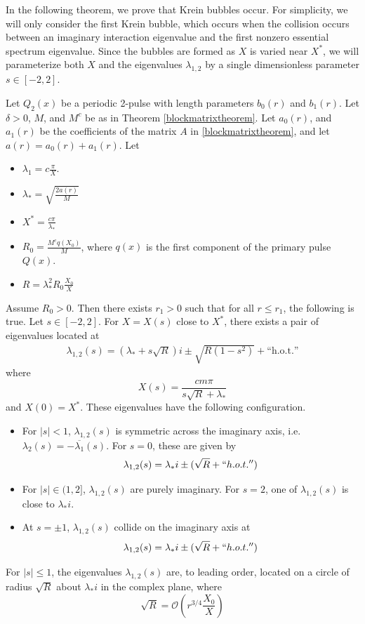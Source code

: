 \documentclass[thesis.tex]{subfiles}
\begin{document}
In the following theorem, we prove that Krein bubbles occur. For simplicity, we will only consider the first Krein bubble, which occurs when the collision occurs between an imaginary interaction eigenvalue and the first nonzero essential spectrum eigenvalue. Since the bubbles are formed as $X$ is varied near $X^*$, we will parameterize both $X$ and the eigenvalues $\lambda_{1,2}$ by a single dimensionless parameter $s \in [-2, 2]$. 

\begin{theorem}\label{theorem:kreinbubbles}
Let $Q_2(x)$ be a periodic 2-pulse with length parameters $b_0(r)$ and $b_1(r)$. Let $\delta > 0$, $M$, and $M^c$ be as in Theorem \ref{blockmatrixtheorem}. Let $a_0(r)$, and $a_1(r)$ be the coefficients of the matrix $A$ in \ref{blockmatrixtheorem}, and let $a(r) = a_0(r) + a_1(r)$. Let
\begin{itemize}
\item $\lambda_1 = c \frac{\pi}{X}$.
\item $\lambda_* = \sqrt{\frac{2 a(r) }{M}}$
\item $X^* = \frac{c \pi}{\lambda_*}$
\item $R_0 = \frac{M^c q(X_0)}{M}$, where $q(x)$ is the first component of the primary pulse $Q(x)$.
\item $R = \lambda_*^2 R_0 \frac{X_0}{X}$
\end{itemize}

Assume $R_0 > 0$. Then there exists $r_1 > 0$ such that for all $r \leq r_1$, the following is true. Let $s \in [-2, 2]$. For $X = X(s)$ close to $X^*$, there exists a pair of eigenvalues located at
\begin{align*}
\lambda_{1,2}(s) = \left( \lambda_* + s \sqrt{R} \right) i \pm \sqrt{R(1 - s^2)} + \text{``h.o.t.''}
\end{align*}
where
\[
X(s) = \frac{c m \pi}{s \sqrt{R} + \lambda_*}
\]
and $X(0) = X^*$. These eigenvalues have the following configuration.
\begin{itemize}
\item For $|s| < 1$, $\lambda_{1,2}(s)$ is symmetric across the imaginary axis, i.e. $\lambda_2(s) = -\overline{\lambda_1}(s)$. For $s = 0$, these are given by
\[
\lambda_{1,2}(s) = \lambda_* i \pm (\sqrt{R} + ``h.o.t.'')
\]
\item For $|s| \in (1, 2]$, $\lambda_{1,2}(s)$
are purely imaginary. For $s = 2$, one of $\lambda_{1,2}(s)$ is close to $\lambda_* i$.
\item At $s = \pm 1$, $\lambda_{1,2}(s)$ collide on the imaginary axis at 
\[
\lambda_{1,2}(s) = \lambda_* i \pm (\sqrt{R} + ``h.o.t.'')
\]
\end{itemize}
For $|s| \leq 1$, the eigenvalues $\lambda_{1,2}(s)$ are, to leading order, located on a circle of radius $\sqrt{R}$ about $\lambda_* i$ in the complex plane, where
\[
\sqrt{R} = \mathcal{O}\left( r^{3/4}\frac{X_0}{X} \right)
\]
\end{theorem}
\end{document}
